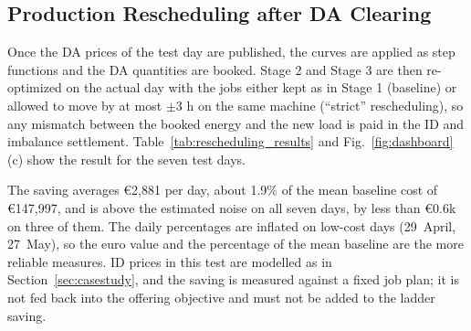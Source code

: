 \documentclass[5p,times,twocolumn]{elsarticle}
\begin{document}
\subsection{Production Rescheduling after DA Clearing}\label{sec:resched}
Once the DA prices of the test day are published, the curves are applied as step functions and the DA quantities are booked. Stage 2 and Stage 3 are then re-optimized on the actual day with the jobs either kept as in Stage 1 (baseline) or allowed to move by at most $\pm3$ h on the same machine (``strict'' rescheduling), so any mismatch between the booked energy and the new load is paid in the ID and imbalance settlement. Table~\ref{tab:rescheduling_results} and Fig.~\ref{fig:dashboard}(c) show the result for the seven test days.

\begin{table}[t]
\caption{Production rescheduling after Day-Ahead clearing (strict: same machine and task, start shifted by at most $\pm3$ h; \euro, daily saving in \% of the daily baseline cost; the mean row gives the mean saving in \% of the mean baseline). Noise = (sum of the two MIP gaps) $\times$ baseline cost.}
\label{tab:rescheduling_results}
\centering
\scriptsize
\setlength{\tabcolsep}{2.5pt}
\end{table}

The saving averages \euro 2,881 per day, about 1.9\% of the mean baseline cost of \euro 147,997, and is above the estimated noise on all seven days, by less than \euro 0.6k on three of them. The daily percentages are inflated on low-cost days (29~April, 27~May), so the euro value and the percentage of the mean baseline are the more reliable measures. ID prices in this test are modelled as in Section~\ref{sec:casestudy}, and the saving is measured against a fixed job plan; it is not fed back into the offering objective and must not be added to the ladder saving.
\end{document}
